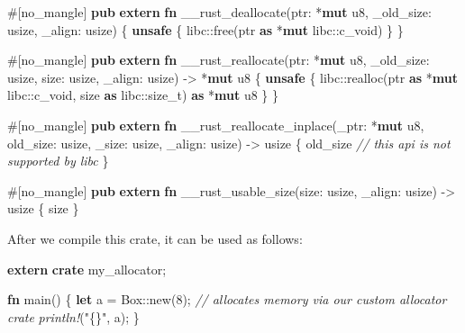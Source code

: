 \documentclass[a4paper,]{book}
\newenvironment{Shaded}{\begin{snugshade}}{\end{snugshade}}
\newcommand{\KeywordTok}[1]{\textcolor[rgb]{0.13,0.29,0.53}{\textbf{{#1}}}}
\newcommand{\DataTypeTok}[1]{\textcolor[rgb]{0.13,0.29,0.53}{{#1}}}
\newcommand{\DecValTok}[1]{\textcolor[rgb]{0.00,0.00,0.81}{{#1}}}
\newcommand{\StringTok}[1]{\textcolor[rgb]{0.31,0.60,0.02}{{#1}}}
\newcommand{\CommentTok}[1]{\textcolor[rgb]{0.56,0.35,0.01}{\textit{{#1}}}}
\newcommand{\PreprocessorTok}[1]{\textcolor[rgb]{0.56,0.35,0.01}{\textit{{#1}}}}
\newcommand{\AttributeTok}[1]{\textcolor[rgb]{0.77,0.63,0.00}{{#1}}}
\newcommand{\NormalTok}[1]{{#1}}
\begin{document}
\begin{Shaded}
\begin{Highlighting}[]
\AttributeTok{#[}\NormalTok{no_mangle}\AttributeTok{]}
\KeywordTok{pub} \KeywordTok{extern} \KeywordTok{fn} \NormalTok{__rust_deallocate(ptr: *}\KeywordTok{mut} \DataTypeTok{u8}\NormalTok{, _old_size: }\DataTypeTok{usize}\NormalTok{, _align: }\DataTypeTok{usize}\NormalTok{) \{}
    \KeywordTok{unsafe} \NormalTok{\{ libc::free(ptr }\KeywordTok{as} \NormalTok{*}\KeywordTok{mut} \NormalTok{libc::}\DataTypeTok{c_void}\NormalTok{) \}}
\NormalTok{\}}

\AttributeTok{#[}\NormalTok{no_mangle}\AttributeTok{]}
\KeywordTok{pub} \KeywordTok{extern} \KeywordTok{fn} \NormalTok{__rust_reallocate(ptr: *}\KeywordTok{mut} \DataTypeTok{u8}\NormalTok{, _old_size: }\DataTypeTok{usize}\NormalTok{, size: }\DataTypeTok{usize}\NormalTok{,}
                                \NormalTok{_align: }\DataTypeTok{usize}\NormalTok{) -> *}\KeywordTok{mut} \DataTypeTok{u8} \NormalTok{\{}
    \KeywordTok{unsafe} \NormalTok{\{}
        \NormalTok{libc::realloc(ptr }\KeywordTok{as} \NormalTok{*}\KeywordTok{mut} \NormalTok{libc::}\DataTypeTok{c_void}\NormalTok{, size }\KeywordTok{as} \NormalTok{libc::}\DataTypeTok{size_t}\NormalTok{) }\KeywordTok{as} \NormalTok{*}\KeywordTok{mut} \DataTypeTok{u8}
    \NormalTok{\}}
\NormalTok{\}}

\AttributeTok{#[}\NormalTok{no_mangle}\AttributeTok{]}
\KeywordTok{pub} \KeywordTok{extern} \KeywordTok{fn} \NormalTok{__rust_reallocate_inplace(_ptr: *}\KeywordTok{mut} \DataTypeTok{u8}\NormalTok{, old_size: }\DataTypeTok{usize}\NormalTok{,}
                                        \NormalTok{_size: }\DataTypeTok{usize}\NormalTok{, _align: }\DataTypeTok{usize}\NormalTok{) -> }\DataTypeTok{usize} \NormalTok{\{}
    \NormalTok{old_size }\CommentTok{// this api is not supported by libc}
\NormalTok{\}}

\AttributeTok{#[}\NormalTok{no_mangle}\AttributeTok{]}
\KeywordTok{pub} \KeywordTok{extern} \KeywordTok{fn} \NormalTok{__rust_usable_size(size: }\DataTypeTok{usize}\NormalTok{, _align: }\DataTypeTok{usize}\NormalTok{) -> }\DataTypeTok{usize} \NormalTok{\{}
    \NormalTok{size}
\NormalTok{\}}
\end{Highlighting}
\end{Shaded}

After we compile this crate, it can be used as follows:

\begin{Shaded}
\begin{Highlighting}[]
\KeywordTok{extern} \KeywordTok{crate} \NormalTok{my_allocator;}

\KeywordTok{fn} \NormalTok{main() \{}
    \KeywordTok{let} \NormalTok{a = }\DataTypeTok{Box}\NormalTok{::new(}\DecValTok{8}\NormalTok{); }\CommentTok{// allocates memory via our custom allocator crate}
    \PreprocessorTok{println!}\NormalTok{(}\StringTok{"\{\}"}\NormalTok{, a);}
\NormalTok{\}}
\end{Highlighting}
\end{Shaded}
\end{document}
